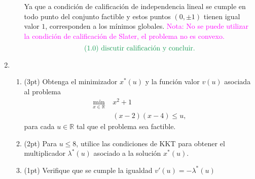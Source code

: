 \documentclass{article}
\begin{document}
\begin{enumerate}
\begin{enumerate}
		Ya que a condición de calificación de independencia lineal se cumple en todo punto del conjunto factible y estos puntos \((0, \pm 1)\) tienen igual valor \(1\), corresponden a los mínimos globales. \textcolor{magenta}{Nota: No se puede utilizar la condición de calificación de Slater, el problema no es convexo.}
		\[
			\text{\textcolor{ForestGreen}{(1.0) discutir calificación y concluir.}}
		\]
		\end{enumerate}
	\item 
		\begin{enumerate}
			\item (3pt) Obtenga el minimizador \(x^*(u)\) y la función valor \(v(u)\) asociada al problema
				\begin{align*}
					\min_{x \in \mathbb{R}}\; & x^2 + 1 \\
								  & (x - 2)(x - 4) \leq u,
				\end{align*}
				para cada \(u \in \mathbb{R}\) tal que el problema sea factible.
			\item (2pt) Para \(u \leq 8\), utilice las condiciones de KKT para obtener el multiplicador \(\lambda^*(u)\) asociado a la solución \(x^*(u)\).
			\item (1pt) Verifique que se cumple la igualdad \(v'(u) = -\lambda^*(u)\)
		\end{enumerate}


\end{enumerate}
\end{document}
